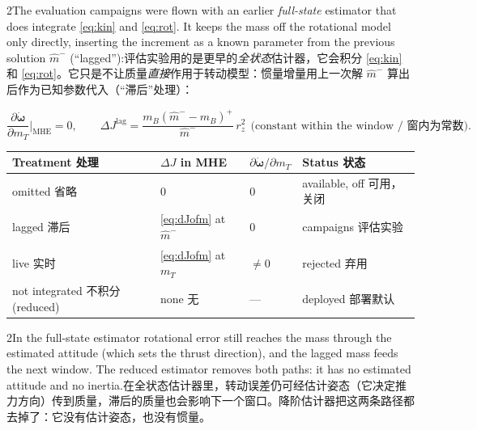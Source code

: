 \documentclass[10pt,a4paper]{article}
\numberwithin{equation}{section}
\newcommand{\dJ}{\Delta J}
\newcommand{\mB}{m_B}
\newcommand{\mT}{m_T}
\newcommand{\pair}[2]{\begin{paracol}{2}#1\switchcolumn #2\end{paracol}}
\begin{document}
\pair{The evaluation campaigns were flown with an earlier \emph{full-state}
estimator that does integrate \eqref{eq:kin} and \eqref{eq:rot}. It keeps the
mass off the rotational model only directly, inserting the increment as a known
parameter from the previous solution $\hat m^-$ (``lagged''):}
{评估实验用的是更早的\emph{全状态}估计器，它会积分 \eqref{eq:kin} 和 \eqref{eq:rot}。它只是不让质量\emph{直接}作用于转动模型：惯量增量用上一次解 $\hat m^-$ 算出后作为已知参数代入（“滞后”处理）：}
\begin{equation}
\frac{\partial\dot{\bm\omega}}{\partial\mT}\Big|_{\mathrm{MHE}}=0,\qquad
\dJ^{\mathrm{lag}}=\frac{\mB(\hat m^- -\mB)^+}{\hat m^-}\,r_z^2\ \ \text{(constant within the window / 窗内为常数)}.
\label{eq:lag}
\end{equation}
\begin{center}\small
\begin{tabular}{@{}llll@{}}
\toprule
Treatment 处理 & $\dJ$ in MHE & $\partial\dot{\bm\omega}/\partial\mT$ & Status 状态\\
\midrule
omitted 省略 & 0 & 0 & available, off 可用，关闭\\
lagged 滞后 & \eqref{eq:dJofm} at $\hat m^-$ & 0 & campaigns 评估实验\\
live 实时 & \eqref{eq:dJofm} at $\mT$ & $\neq0$ & rejected 弃用\\
\midrule
not integrated 不积分 (reduced) & none 无 & --- & deployed 部署默认\\
\bottomrule
\end{tabular}
\end{center}
\pair{In the full-state estimator rotational error still reaches the mass
through the estimated attitude (which sets the thrust direction), and the lagged
mass feeds the next window. The reduced estimator removes both paths: it has no
estimated attitude and no inertia.}
{在全状态估计器里，转动误差仍可经估计姿态（它决定推力方向）传到质量，滞后的质量也会影响下一个窗口。降阶估计器把这两条路径都去掉了：它没有估计姿态，也没有惯量。}
\end{document}
